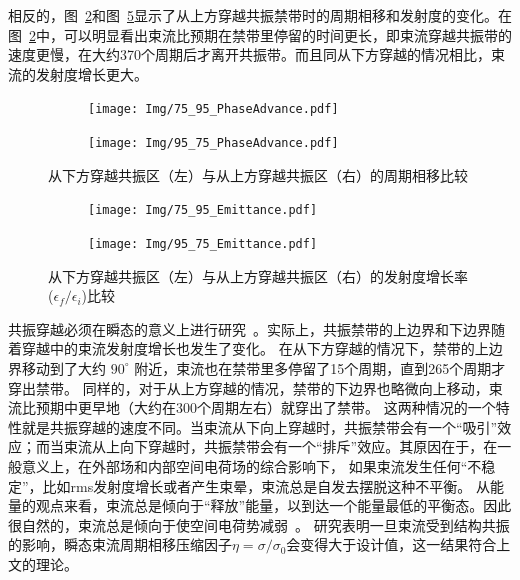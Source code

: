 相反的，图~\ref{sfig:95_75phase}和图~\ref{sfig:95_75emittance}显示了从上方穿越共振禁带时的周期相移和发射度的变化。在图~\ref{sfig:95_75phase}中，可以明显看出束流比预期在禁带里停留的时间更长，即束流穿越共振带的速度更慢，在大约370个周期后才离开共振带。而且同从下方穿越的情况相比，束流的发射度增长更大。

\begin{figure}[thbp]
    \centering
    \begin{subfigure}[b]{0.48\textwidth}
        \centering
        \texttt{[image: Img/75\_95\_PhaseAdvance.pdf]}
        \caption{}
        \label{sfig:75_95phase}
    \end{subfigure}
    \begin{subfigure}[b]{0.48\textwidth}
        \centering
        \texttt{[image: Img/95\_75\_PhaseAdvance.pdf]}
        \caption{}
        \label{sfig:95_75phase}
    \end{subfigure}
    \caption{从下方穿越共振区（左）与从上方穿越共振区（右）的周期相移比较}
    \label{fig:phase_advance}
\end{figure}

\begin{figure}[thbp]
    \centering
    \begin{subfigure}[b]{0.48\textwidth}
        \centering
        \texttt{[image: Img/75\_95\_Emittance.pdf]}
        \caption{}
        \label{sfig:75_95emittance}
    \end{subfigure}
    \begin{subfigure}[b]{0.48\textwidth}
        \centering
        \texttt{[image: Img/95\_75\_Emittance.pdf]}
        \caption{}
        \label{sfig:95_75emittance}
    \end{subfigure}
    \caption{从下方穿越共振区（左）与从上方穿越共振区（右）的发射度增长率($\epsilon_f/\epsilon_i$)比较
     }
    \label{fig:emittance}
\end{figure}

共振穿越必须在瞬态的意义上进行研究~\cite{12}。实际上，共振禁带的上边界和下边界随着穿越中的束流发射度增长也发生了变化。
在从下方穿越的情况下，禁带的上边界移动到了大约 $90^{\circ}$ 附近，束流也在禁带里多停留了15个周期，直到265个周期才穿出禁带。
同样的，对于从上方穿越的情况，禁带的下边界也略微向上移动，束流比预期中更早地（大约在300个周期左右）就穿出了禁带。
这两种情况的一个特性就是共振穿越的速度不同。当束流从下向上穿越时，共振禁带会有一个“吸引”效应；而当束流从上向下穿越时，共振禁带会有一个“排斥”效应。其原因在于，在一般意义上，在外部场和内部空间电荷场的综合影响下，
如果束流发生任何“不稳定”，比如rms发射度增长或者产生束晕，束流总是自发去摆脱这种不平衡。
从能量的观点来看，束流总是倾向于“释放”能量，以到达一个能量最低的平衡态。因此很自然的，束流总是倾向于使空间电荷势减弱~\cite{17}。
研究表明一旦束流受到结构共振的影响，瞬态束流周期相移压缩因子$\eta=\sigma/\sigma_0$会变得大于设计值，这一结果符合上文的理论。

